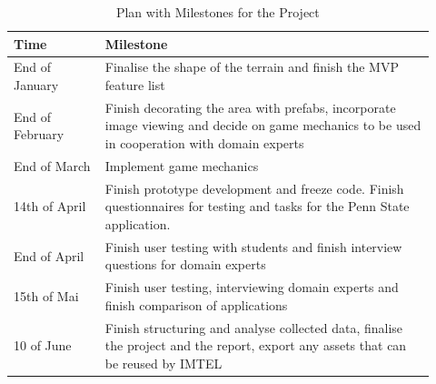     \FloatBarrier
    \begin{table}
    \label{tab:plan}
    \caption{Plan with Milestones for the Project}
    \begin{tabular}{| p{0.2\linewidth} | p{0.725\linewidth} |}
        \hline
        \textbf{Time} & \textbf{Milestone} \\
        \hline
        End of January & Finalise the shape of the terrain and finish the MVP feature list \\
        End of February & Finish decorating the area with prefabs, incorporate image viewing and decide on game mechanics to be used in cooperation with domain experts \\
        End of March & Implement game mechanics \\
        14th of April & Finish prototype development and freeze code. Finish questionnaires for testing and tasks for the Penn State application. \\
        End of April & Finish user testing with students and finish interview questions for domain experts \\
        15th of Mai & Finish user testing, interviewing domain experts and finish comparison of applications \\
        10 of June & Finish structuring and analyse collected data, finalise the project and the report, export any assets that can be reused by IMTEL \\
        \hline
    \end{tabular}
    \end{table}
    \FloatBarrier

